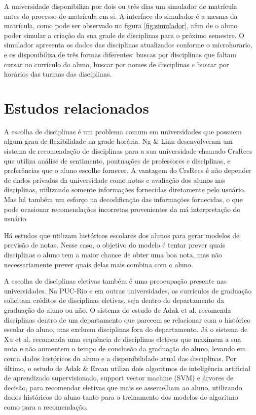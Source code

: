 A universidade disponibiliza por dois ou três dias um simulador de matrícula  antes do processo de matrícula em si. A interface do simulador é a mesma da matrícula, como pode ser observado na figura \ref{fig:simulador}, 
afim de o aluno poder simular a criação da sua grade de disciplinas para o próximo semestre. O simulador apresenta os dados das disciplinas atualizados conforme o microhorario, e os disponibiliza de três formas diferentes: buscas por disciplinas que faltam cursar no currículo do aluno, buscar por nomes de disciplinas e buscar por horários das turmas das 
disciplinas.\cite{doc-matricula}



\section{Estudos relacionados}

A escolha de disciplinas é um problema comum em universidades que possuem algum grau de flexibilidade na grade horária. Ng \& Linn\cite{crs-recs} desenvolveram um sistema de recomendação de disciplinas para a sua universidade chamado CrsRecs que utiliza análise de sentimento, pontuações de professores e disciplinas, e preferências que o aluno escolhe fornecer. A vantagem do CrsRecs é não depender de dados privados da universidade como notas e avaliação dos alunos nas disciplinas, utilizando somente informações fornecidas diretamente pelo usuário. Mas há também um esforço na decodificação das informações fornecidas, o que pode ocasionar recomendações incorretas provenientes da má interpretação do usuário.

Há estudos que utilizam históricos escolares dos alunos para gerar modelos de previsão de notas.\cite{rani-machine-learning,nguyen-learning-outcome,adak-fuzzy} Nesse caso, o objetivo do modelo é tentar prever quais disciplinas o aluno tem a maior chance de obter uma boa nota, mas não necessariamente prever quais delas mais combina com o aluno.\cite{rani-machine-learning,nguyen-learning-outcome}

A escolha de disciplinas eletivas também é uma preocupação presente nas universidades. Na PUC-Rio e em outras universidades, os currículos de graduação solicitam créditos de disciplinas eletivas, seja dentro do departamento da graduação do aluno ou não. O sistema do estudo de Adak et al.\cite{adak-fuzzy} recomenda disciplinas dentro de um departamento que parecem se relacionar com o histórico escolar do aluno, mas excluem disciplinas fora do departamento.
Já o sistema de Xu et al.\cite{xu-personalizado} recomenda uma sequência de disciplinas eletivas que maximem a sua nota e não aumentem o tempo de conclusão da graduação do aluno, levando em conta dados históricos do aluno e a disponibilidade atual das disciplinas. 
Por último, o estudo de Adak \& Ercan\cite{adak-svm} utiliza dois algoritmos de inteligência artificial de aprendizado supervisionado, support vector machine (SVM) e árvores de decisão, para recomendar eletivas que mais se assemelham ao aluno, utilizando dados históricos do aluno tanto para o treinamento dos modelos de algoritmo como para a recomendação.

